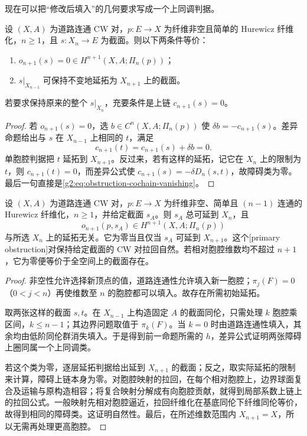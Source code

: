 现在可以把“修改后填入”的几何要求写成一个上同调判据。

\begin{theorem}\label{g2:thm:obstruction-extension}
	设 \((X,A)\) 为道路连通 CW 对，\(p:E\to X\) 为纤维非空且简单的 Hurewicz 纤维化，\(n\ge1\)，且 \(s:X_n\to E\) 为截面。则以下两条件等价：
	\begin{enumerate}
		\item \(o_{n+1}(s)=0\in H^{n+1}(X,A;\Pi_n(p))\)；
		\item \(s|_{X_{n-1}}\) 可保持不变地延拓为 \(X_{n+1}\) 上的截面。
	\end{enumerate}
	若要求保持原来的整个 \(s|_{X_n}\)，充要条件是上链 \(c_{n+1}(s)=0\)。
\end{theorem}
\begin{proof}
	若 \(o_{n+1}(s)=0\)，选 \(b\in C^n(X,A;\Pi_n(p))\) 使 \(\delta b=-c_{n+1}(s)\)。差异命题给出与 \(s\) 在 \(X_{n-1}\) 上相同的 \(t\)，满足
	\[
		c_{n+1}(t)=c_{n+1}(s)+\delta b=0.
	\]
	单胞腔判据把 \(t\) 延拓到 \(X_{n+1}\)。反过来，若有这样的延拓，记它在 \(X_n\) 上的限制为 \(t\)，则 \(c_{n+1}(t)=0\)，而差异公式使 \(c_{n+1}(s)=-\delta D_n(s,t)\)，故障碍类为零。最后一句直接是\cref{g2:eq:obstruction-cochain-vanishing}。
\end{proof}

\begin{theorem}\label{g2:thm:primary-obstruction}
	设 \((X,A)\) 为道路连通 CW 对，\(p:E\to X\) 为纤维非空、简单且 \((n-1)\) 连通的 Hurewicz 纤维化，\(n\ge1\)，并给定截面 \(s_A\)。则 \(s_A\) 总可延到 \(X_n\)，且
	\[
		o_{n+1}(p,s_A)\in H^{n+1}(X,A;\Pi_n(p))
	\]
	与所选 \(X_n\) 上的延拓无关。它为零当且仅当 \(s_A\) 可延到 \(X_{n+1}\)。这个[primary obstruction]对保持给定截面的 CW 对拉回自然。若相对胞腔维数均不超过 \(n+1\)，它为零便等价于全空间上的截面存在。
\end{theorem}
\begin{proof}
	非空性允许选择新顶点的值，道路连通性允许填入新一胞腔；\(\pi_j(F)=0\)（\(0<j<n\)）再使维数至 \(n\) 的胞腔都可以填入。故存在所需初始延拓。

	取两张这样的截面 \(s,t\)。在 \(X_{n-1}\) 上构造固定 \(A\) 的截面同伦，只需处理 \(k\) 胞腔乘区间，\(k\le n-1\)；其边界问题取值于 \(\pi_k(F)\)。当 \(k=0\) 时由道路连通性填入，其余均由低阶同伦群消失填入。于是得到前一命题所需的 \(h\)，差异公式证明两张障碍上圈同属一个上同调类。

	若这个类为零，逐层延拓判据给出延到 \(X_{n+1}\) 的截面；反之，取实际延拓的限制来计算，障碍上链本身为零。对胞腔映射的拉回，在每个相对胞腔上，边界球面复合及运输与原构造相容；将复合映射分解成有向胞腔贡献，就得到局部系数上链上的拉回公式。一般映射先相对胞腔逼近，拉回纤维化在基底同伦下纤维同伦等价，故得到相同的障碍类。这证明自然性。最后，在所述维数范围内 \(X_{n+1}=X\)，所以无需再处理更高胞腔。
\end{proof}


